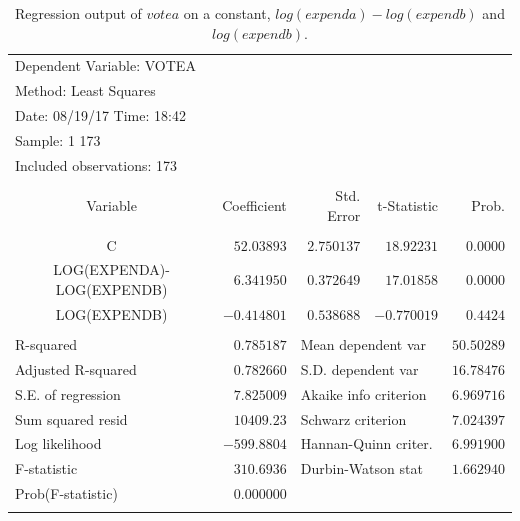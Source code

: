 \documentclass[12pt]{report}
\begin{document}
\begin{table}[H]
	\centering
	\begin{tabular}{lrrrr}
		\multicolumn{3}{l}{Dependent Variable: VOTEA}&\multicolumn{1}{c}{}&\multicolumn{1}{c}{}\\
		\multicolumn{3}{l}{Method: Least Squares}&\multicolumn{1}{c}{}&\multicolumn{1}{c}{}\\
		\multicolumn{3}{l}{Date: 08/19/17   Time: 18:42}&\multicolumn{1}{c}{}&\multicolumn{1}{c}{}\\
		\multicolumn{2}{l}{Sample: 1 173}&\multicolumn{1}{c}{}&\multicolumn{1}{c}{}&\multicolumn{1}{c}{}\\
		\multicolumn{3}{l}{Included observations: 173}&\multicolumn{1}{c}{}&\multicolumn{1}{c}{}\\
		[4.5pt] \hline \\ [-4.5pt]
		\multicolumn{1}{c}{Variable}&\multicolumn{1}{r}{Coefficient}&\multicolumn{1}{r}{Std. Error}&\multicolumn{1}{r}{t-Statistic}&\multicolumn{1}{r}{Prob.}\\
		[4.5pt] \hline \\ [-4.5pt]
		\multicolumn{1}{c}{C}&\multicolumn{1}{r}{$52.03893$}&\multicolumn{1}{r}{$2.750137$}&\multicolumn{1}{r}{$18.92231$}&\multicolumn{1}{r}{$0.0000$}\\
		\multicolumn{1}{c}{LOG(EXPENDA)-LOG(EXPENDB)}&\multicolumn{1}{r}{$6.341950$}&\multicolumn{1}{r}{$0.372649$}&\multicolumn{1}{r}{$17.01858$}&\multicolumn{1}{r}{$0.0000$}\\
		\multicolumn{1}{c}{LOG(EXPENDB)}&\multicolumn{1}{r}{$-0.414801$}&\multicolumn{1}{r}{$0.538688$}&\multicolumn{1}{r}{$-0.770019$}&\multicolumn{1}{r}{$0.4424$}\\
		[4.5pt] \hline \\ [-4.5pt]
		\multicolumn{1}{l}{R-squared}&\multicolumn{1}{r}{$0.785187$}&\multicolumn{2}{l}{Mean dependent var}&\multicolumn{1}{r}{$50.50289$}\\
		\multicolumn{1}{l}{Adjusted R-squared}&\multicolumn{1}{r}{$0.782660$}&\multicolumn{2}{l}{S.D. dependent var}&\multicolumn{1}{r}{$16.78476$}\\
		\multicolumn{1}{l}{S.E. of regression}&\multicolumn{1}{r}{$7.825009$}&\multicolumn{2}{l}{Akaike info criterion}&\multicolumn{1}{r}{$6.969716$}\\
		\multicolumn{1}{l}{Sum squared resid}&\multicolumn{1}{r}{$10409.23$}&\multicolumn{2}{l}{Schwarz criterion}&\multicolumn{1}{r}{$7.024397$}\\
		\multicolumn{1}{l}{Log likelihood}&\multicolumn{1}{r}{$-599.8804$}&\multicolumn{2}{l}{Hannan-Quinn criter.}&\multicolumn{1}{r}{$6.991900$}\\
		\multicolumn{1}{l}{F-statistic}&\multicolumn{1}{r}{$310.6936$}&\multicolumn{2}{l}{Durbin-Watson stat}&\multicolumn{1}{r}{$1.662940$}\\
		\multicolumn{1}{l}{Prob(F-statistic)}&\multicolumn{1}{r}{$0.000000$}&\multicolumn{1}{c}{}&\multicolumn{1}{c}{}&\multicolumn{1}{c}{}\\
		[4.5pt] \hline \\ [-4.5pt]
	\end{tabular}
	\caption{Regression output of $votea$ on a constant, $log(expenda)-log(expendb)$ and $log(expendb)$.}
\end{table}
\end{document}
